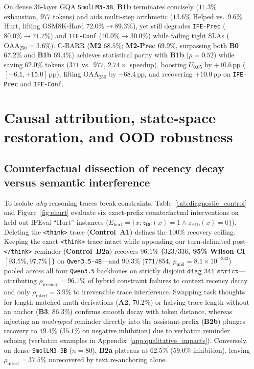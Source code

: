 \documentclass{article}
\begin{document}
On dense 36-layer GQA \texttt{SmolLM3-3B}, \textbf{B1b} terminates concisely ($11.3\%$ exhaustion, $977$ tokens) and aids multi-step arithmetic ($13.6\%$ Helped vs.\ $9.6\%$ Hurt, lifting GSM8K-Hard $72.0\% \to 89.3\%$), yet still degrades \texttt{IFE-Prec} ($80.0\% \to 71.7\%$) and \texttt{IFE-Conf} ($40.0\% \to 30.0\%$) while failing tight SLAs ($\text{OAA}_{250}=3.6\%$). C-BARR (\textbf{M2} $68.5\%$; \textbf{M2-Prec} \textbf{$69.9\%$}, surpassing both \textbf{B0} $67.2\%$ and \textbf{B1b} $69.4\%$) achieves statistical parity with \textbf{B1b} ($p=0.52$) while saving $62.0\%$ tokens ($371$ vs.\ $977$, $2.74\times$ speedup), boosting $U_{0.05}$ by $+10.6$\,pp ($[+6.1, +15.0]$\,pp), lifting $\text{OAA}_{250}$ by $+68.4$\,pp, and recovering $+10.0$\,pp on \texttt{IFE-Prec} and \texttt{IFE-Conf}.



\section{Causal attribution, state-space restoration, and OOD robustness}
\label{sec:mechanistic}

\subsection{Counterfactual dissection of recency decay versus semantic interference}
To isolate \emph{why} reasoning traces break constraints, Table~\ref{tab:diagnostic_control} and Figure~\ref{fig:ehurt} evaluate six exact-prefix counterfactual interventions on held-out IFEval ``Hurt'' instances ($E_{\text{hurt}} = \{x : z_{\text{B0}}(x)=1 \land z_{\text{B1b}}(x)=0\}$). Deleting the \texttt{<think>} trace (\textbf{Control~A1}) defines the $100\%$ recovery ceiling. Keeping the exact \texttt{<think>} trace intact while appending our turn-delimited post-\texttt{</think>} reminder (\textbf{Control~B2a}) recovers \textbf{$96.1\%$ ($323/336$, 95\% Wilson CI $[93.5\%, 97.7\%]$)} on \texttt{Qwen3.5-4B}---and $90.3\%$ ($771/854$, $p_{\text{mid}} = 8.1 \times 10^{-233}$) pooled across all four \texttt{Qwen3.5} backbones on strictly disjoint $\texttt{diag\_341\_strict}$---attributing $\rho_{\text{recency}} = 96.1\%$ of hybrid constraint failures to context recency decay and only $\rho_{\text{interf}} = 3.9\%$ to irreversible trace interference. Swapping task thoughts for length-matched math derivations (\textbf{A2}, $70.2\%$) or halving trace length without an anchor (\textbf{B3}, $86.3\%$) confirms smooth decay with token distance, whereas injecting an \emph{unstripped} reminder directly into the assistant prefix (\textbf{B2b}) plunges recovery to $49.4\%$ ($35.1\%$ on negative inhibition) due to verbatim reminder echoing (verbatim examples in Appendix~\ref{app:qualitative_impacts}). Conversely, on dense \texttt{SmolLM3-3B} ($n=80$), \textbf{B2a} plateaus at $62.5\%$ ($59.0\%$ inhibition), leaving $\rho_{\text{interf}} = 37.5\%$ unrecovered by text re-anchoring alone.
\end{document}
